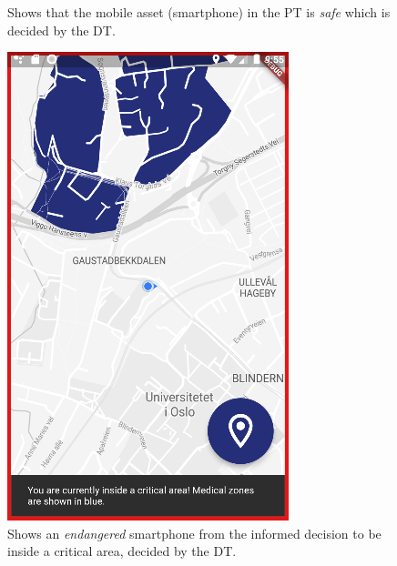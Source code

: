 \documentclass{article}
\begin{document}
\begin{figure}[H]
\begin{minipage}[c]{0.40\linewidth}
        \caption{Shows that the mobile asset (smartphone) in the PT is \emph{safe} which is decided by the DT.}
        \label{fig:safe_smartphone}
    \end{minipage}
    \hfill
    \begin{minipage}[c]{0.40\linewidth}
        \includegraphics[width=\linewidth]{graphics/endangered_smartphone.png}
        \caption{Shows an \emph{endangered} smartphone from the informed decision to be inside a critical area, decided by the DT.}
        \label{fig:endangered_smartphone}
    \end{minipage}
\end{figure}
\end{document}
